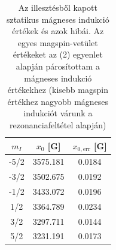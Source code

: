 \documentclass[12pt,a4paper]{article}
\begin{document}
\begin{table}[!h]
\begin{center}
\begin{tabular}{|c|c|c|}
\hline
$m_I$ & $x_0$ [G] & $x_{0,\textrm{err}}$ [G] \\
\hline
-5/2 & 3575.181 & 0.0184 \\
\hline
-3/2 & 3502.675 & 0.0192\\
\hline
-1/2 & 3433.072 & 0.0196\\
\hline
1/2 & 3364.789 & 0.0234\\
\hline
3/2 & 3297.711 & 0.0144\\
\hline
5/2 & 3231.191 & 0.0173\\
\hline
\end{tabular}
\caption{Az illesztésből kapott sztatikus mágneses indukció értékek és azok hibái. Az egyes magspin-vetület értékeket az (2) egyenlet alapján párosítottam a mágneses indukció értékekhez (kisebb magspin értékhez nagyobb mágneses indukciót várunk a rezonanciafeltétel alapján)}
\label{tab:ossz}
\end{center}
\end{table}
\end{document}
